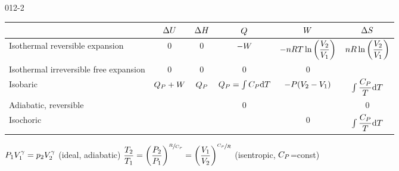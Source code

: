 \begin{mitframe}{012-2} %


\begin{longtable}{ | p{2cm} | c | c | c | c | c | } 
 \hline
     & $\Delta\intenergy$
    & $\Delta\enthalpy$ 
    & $\heatflow$ 
    & $\work$
    & $\Delta\entropy$
    \\
    \hline
	Isothermal reversible expansion & 0 & 0 & $-\work$ & $-n\gasconst\Temp\ln\bigg(\dfrac{\vol_{2}}{\vol_{1}}\bigg)$ & $n\gasconst\ln\bigg(\dfrac{\vol_{2}}{\vol_{1}}\bigg)$  \\ \hline
	
    Isothermal irreversible free expansion & 0 & 0 & 0 & 0 &  \\ \hline    
	Isobaric & $\heatflow_{\p}+\work$ & $\heatflow_{\p}$ & $\heatflow_{\p}=\int\cp\mathrm{d}\Temp$  & $-\p(\vol_{2}-\vol_{1})$ & $\int\dfrac{\cp}{\Temp}\mathrm{d}\Temp$  \\ \hline   
 	Adiabatic, reversible & & & 0 & & 0 \\ \hline
	Isochoric & & & & 0 & $\int\dfrac{\cp}{\Temp}\mathrm{d}\Temp$  \\ \hline 
\end{longtable}

\begin{listone}
	
    \item $\p_{1}\vol_{1}^{\gamma}=p_{2}\vol_{2}^{\gamma}$  (ideal, adiabatic)  $\dfrac{\Temp_{2}}{\Temp_{1}}=\bigg(\dfrac{\p_{2}}{\p_{1}}\bigg)^{\sfrac{\gasconst}{\cp}}=\bigg(\dfrac{\vol_{1}}{\vol_{2}}\bigg)^{\sfrac{\cp}{\gasconst}}$ (isentropic, $\cp$=const)
 
\end{listone}

\end{mitframe}